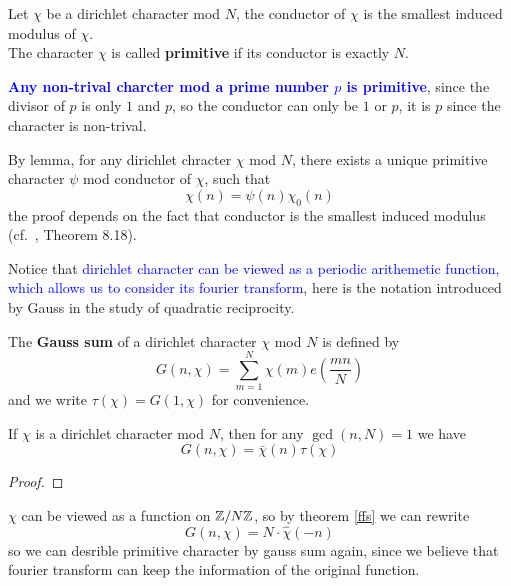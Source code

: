 \begin{colordefinition}
    Let \(\chi\) be a dirichlet character mod \(N\), the conductor of \(\chi\) is the smallest induced modulus of \(\chi\).\\

    The character \(\chi\) is called \textbf{primitive} if its conductor is exactly \(N\).
\end{colordefinition}

\begin{remark}
    \textcolor{blue}{\textbf{Any non-trival charcter mod a prime number \(p\) is primitive}}, since the divisor of \(p\) is only \(1\) and \(p\), so the conductor can only be \(1\) or \(p\), it is \(p\) since the character is non-trival.
\end{remark}

\begin{remark}
    By lemma, for any dirichlet chracter \(\chi\) mod \(N\), there exists a unique primitive character \(\psi\) mod conductor of \(\chi\), such that 
    \[\chi(n) = \psi(n)\chi_0(n)\]
    the proof depends on the fact that conductor is the smallest induced modulus (cf.~\cite{Apostol}, Theorem 8.18).
\end{remark}

Notice that \textcolor{blue}{ dirichlet character can be viewed as a periodic arithemetic function, which allows us to consider its fourier transform}, here is the notation introduced by Gauss in the study of quadratic reciprocity.

\begin{colordefinition}
    The \textbf{Gauss sum} of a dirichlet character \(\chi\) mod \(N\) is defined by
    \[G(n,\chi) = \sum_{m = 1}^N \chi(m) e(\frac{mn}{N})\]
    and we write \(\tau(\chi) = G(1,\chi)\) for convenience.
\end{colordefinition}



\begin{lemma}
    If \(\chi\) is a dirichlet character mod \(N\), then for any \(\gcd(n,N) = 1\) we have
    \[G(n,\chi) = \bar{\chi}(n)\tau(\chi)\]
\end{lemma}

\begin{proof}
    
\end{proof}


    \(\chi\) can be viewed as a function on \(\mathbb{Z}/N\mathbb{Z}\), so by theorem \ref{ffs} we can rewrite
    \[G(n,\chi) = N \cdot \hat{\chi}(-n) \]
    so we can desrible primitive character by gauss sum again, since we believe that fourier transform can keep the information of the original function.

